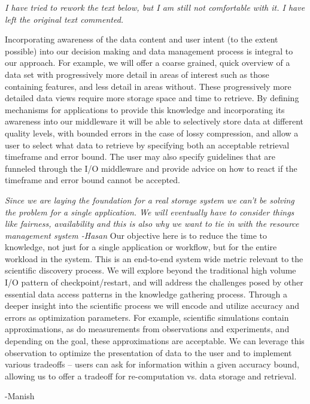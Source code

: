 \documentclass[11pt,letterpaper]{article}
\newcommand{\manish}[1]{{\it \color{red} #1 -Manish}}
\newcommand{\hasan}[1]{{\it \color{darkgreen} #1 -Hasan }}
\newcommand{\manish}[1]{}
\newcommand{\hasan}[1]{}
\begin{document}
\manish{I have tried to rework the text below, but I am still not comfortable with it. I have left the original text commented.

Incorporating awareness of the data content and user intent (to the extent possible) into
our decision making and data management process is integral to our approach. For example, 
we will offer a coarse grained, quick overview of a data set with progressively more detail in 
areas of interest such as those containing features, and less detail in areas
without. These progressively more detailed data views require more storage
space and time to retrieve. By defining mechanisms for applications to provide this 
knowledge and incorporating its awareness into our middleware 
it will be able to selectively store data at different quality levels, with bounded errors in the case of 
lossy compression, and allow a user to select what data to retrieve by specifying both an acceptable
retrieval timeframe and error bound.
The user may also specify guidelines that are funneled through the I/O middleware and 
provide advice on how to react if the timeframe and error bound cannot be accepted.

\hasan{Since we are laying the foundation for a real storage system we can't
  be solving the problem for a single application. We will eventually have
  to consider things like fairness, availability and this is also why we
  want to tie in with the resource management system} 
%
Our objective here is to reduce the time to knowledge, not just for a single
application or workflow, but for the entire workload in the system. This is
an end-to-end system wide metric relevant to the scientific discovery
process. We will explore beyond the traditional high volume I/O pattern of
checkpoint/restart, and will address the challenges posed by other essential
data access patterns in the knowledge gathering process.  Through a deeper
insight into the scientific process we will encode and utilize accuracy and
errors as optimization parameters.  For example, scientific simulations
contain approximations, as do measurements from observations and
experiments, and depending on the goal, these approximations are
acceptable. We can leverage this observation to optimize the presentation of
data to the user and to implement various tradeoffs -- users can ask for
information within a given accuracy bound, allowing us to offer a tradeoff for
re-computation vs. data storage and retrieval.

}
\end{document}
